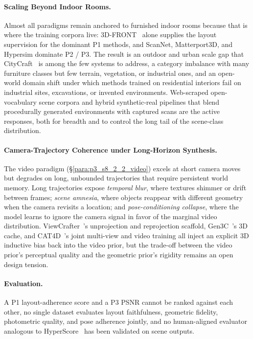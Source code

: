 \paragraph{Scaling Beyond Indoor Rooms.}
Almost all paradigms remain anchored to furnished indoor rooms because that is where the training corpora live: 3D-FRONT~\cite{fu20213dfront} alone supplies the layout supervision for the dominant P1 methods, and ScanNet, Matterport3D, and Hypersim dominate P2 / P3.
The result is an outdoor and urban scale gap that CityCraft~\cite{deng2024citycraft} is among the few systems to address, a category imbalance with many furniture classes but few terrain, vegetation, or industrial ones, and an open-world domain shift under which methods trained on residential interiors fail on industrial sites, excavations, or invented environments.
Web-scraped open-vocabulary scene corpora and hybrid synthetic-real pipelines that blend procedurally generated environments with captured scans are the active responses, both for breadth and to control the long tail of the scene-class distribution.

\paragraph{Camera-Trajectory Coherence under Long-Horizon Synthesis.}
The video paradigm (§\ref{para:p3_s8_2_2_video}) excels at short camera moves but degrades on long, unbounded trajectories that require persistent world memory.
Long trajectories expose \emph{temporal blur}, where textures shimmer or drift between frames; \emph{scene amnesia}, where objects reappear with different geometry when the camera revisits a location; and \emph{pose-conditioning collapse}, where the model learns to ignore the camera signal in favor of the marginal video distribution.
ViewCrafter~\cite{yu2024viewcrafter}'s unprojection and reprojection scaffold, Gen3C~\cite{ren2025gen3c}'s 3D cache, and CAT4D~\cite{wu2025cat4d}'s joint multi-view and video training all inject an explicit 3D inductive bias back into the video prior, but the trade-off between the video prior's perceptual quality and the geometric prior's rigidity remains an open design tension.

\paragraph{Evaluation.}
A P1 layout-adherence score and a P3 PSNR cannot be ranked against each other, no single dataset evaluates layout faithfulness, geometric fidelity, photometric quality, and pose adherence jointly, and no human-aligned evaluator analogous to HyperScore~\cite{zhang2025mate3d} has been validated on scene outputs.

